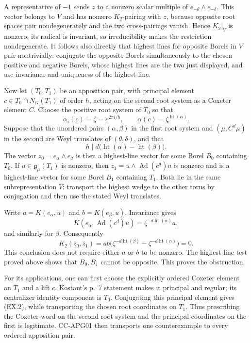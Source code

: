 A representative of $-1$ sends $z$ to a nonzero scalar multiple of
$e_{-\theta}\wedge e_{-\delta}$.  This vector belongs to $V$ and
has nonzero $K_2$-pairing with $z$, because opposite root spaces pair
nondegenerately and the two cross-pairings vanish.  Hence $K_2|_V$
is nonzero; its radical is invariant, so irreducibility makes the
restriction nondegenerate.  It follows also directly that highest
lines for opposite Borels in $V$ pair nontrivially: conjugate the
opposite Borels simultaneously to the chosen positive and negative
Borels, whose highest lines are the two just displayed, and use
invariance and uniqueness of the highest line.

Now let $(T_0,T_1)$ be an apposition pair, with principal element
$c\in T_0\cap N_G(T_1)$ of order $h$, acting on the second root
system as a Coxeter element $C$.  Choose the positive root system
of $T_0$ so that
\[
 \alpha_i(c)=\zeta=e^{2\pi i/h},\qquad
 \alpha(c)=\zeta^{\operatorname{ht}(\alpha)}.
 \tag{EX.2}
\]
Suppose that the unordered pairs $(\alpha,\beta)$ in the first
root system and $(\mu,C^d\mu)$ in the second are Weyl translates
of $(\theta,\delta)$, and that
\[
             h\mid d\bigl(\operatorname{ht}(\alpha)
                            -\operatorname{ht}(\beta)\bigr).
 \tag{EX.3}
\]
The vector $z_0=e_\alpha\wedge e_\beta$ is then a highest-line
vector for some Borel $B_0$ containing $T_0$.  If
$u\in\mathfrak g_\mu(T_1)$ is nonzero, then
$z_1=u\wedge\operatorname{Ad}(c^d)u$ is nonzero and is a
highest-line vector for some Borel $B_1$ containing $T_1$.
Both lie in the same subrepresentation $V$: transport the highest
wedge to the other torus by conjugation and then use the stated
Weyl translates.

Write $a=K(e_\alpha,u)$ and $b=K(e_\beta,u)$.  Invariance gives
\[
 K(e_\alpha,\operatorname{Ad}(c^d)u)
       =\zeta^{-d\operatorname{ht}(\alpha)}a,
\]
and similarly for $\beta$.  Consequently
\[
 K_2(z_0,z_1)=ab\bigl(
       \zeta^{-d\operatorname{ht}(\beta)}
       -\zeta^{-d\operatorname{ht}(\alpha)}\bigr)=0.
 \tag{EX.4}
\]
This conclusion does not require either $a$ or $b$ to be nonzero.
The highest-line test proved above shows that $B_0,B_1$ cannot be
opposite.  This proves the obstruction.

For its applications, one can first choose the explicitly ordered
Coxeter element on $T_1$ and a lift $c$.  Kostant's p.~7 statement
makes it principal and regular; its centralizer identity component
is $T_0$.  Conjugating this principal element gives (EX.2), while
transporting the chosen root coordinates on $T_1$.  Thus prescribing
the Coxeter word on the second root system and the principal
coordinates on the first is legitimate.  CC-APG01 then transports
one counterexample to every ordered apposition pair.

